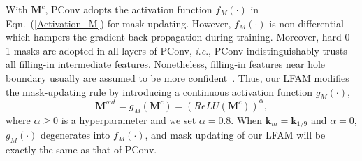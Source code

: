 \documentclass[10pt,journal,compsoc]{IEEEtran}
\newcommand{\ie}{\textit{i}.\textit{e}.}
\begin{document}
%


With $\mathbf{M}^c$, PConv adopts the activation function $f_M(\cdot)$ in Eqn.~(\ref{Activation_M}) for mask-updating.
%
However, $f_M(\cdot)$ is non-differential which hampers the gradient back-propagation during training.
%
Moreover, hard 0-1 masks are adopted in all layers of PConv, \ie, PConv indistinguishably trusts all filling-in intermediate features.
%
Nonetheless, filling-in features near hole boundary usually are assumed to be more confident~\cite{song_contextual_2018}.
%
Thus, our LFAM modifies the mask-updating rule by introducing a continuous activation function $g_M(\cdot)$,
%
\begin{equation}\label{Activation_gM}
	\mathbf{M}^{out} = g_M(\mathbf{M}^{c}) = \left(ReLU(\mathbf{M}^{c})\right)^{\alpha},
\end{equation}
%
where $\alpha \geq 0$ is a hyperparameter and we set $\alpha = 0.8$.
%
When $\mathbf{k}_{m} = \mathbf{k}_{{1}/{9}}$ and $\alpha = 0$, $g_M(\cdot)$ degenerates into $f_M(\cdot)$, and mask updating of our LFAM will be exactly the same as that of PConv.
\end{document}
